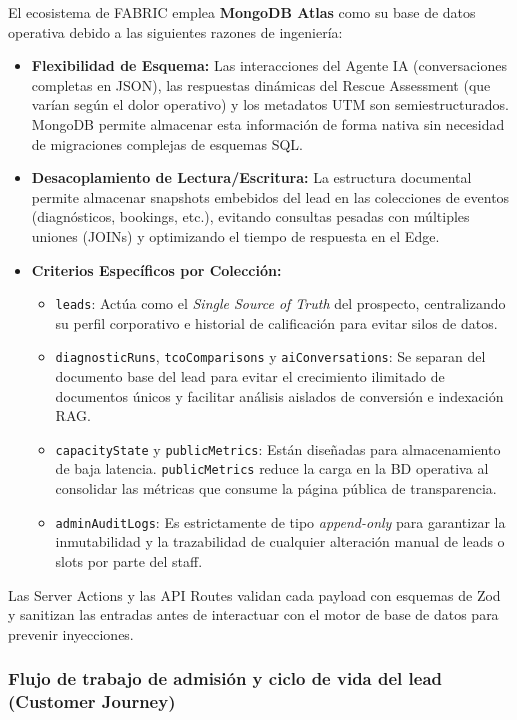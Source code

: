 \documentclass[11pt,letterpaper]{article}
\begin{document}
El ecosistema de FABRIC emplea \textbf{MongoDB Atlas} como su base de datos operativa debido a las siguientes razones de ingeniería:
\begin{itemize}
\item \textbf{Flexibilidad de Esquema:} Las interacciones del Agente IA (conversaciones completas en JSON), las respuestas dinámicas del Rescue Assessment (que varían según el dolor operativo) y los metadatos UTM son semiestructurados. MongoDB permite almacenar esta información de forma nativa sin necesidad de migraciones complejas de esquemas SQL.
\item \textbf{Desacoplamiento de Lectura/Escritura:} La estructura documental permite almacenar snapshots embebidos del lead en las colecciones de eventos (diagnósticos, bookings, etc.), evitando consultas pesadas con múltiples uniones (JOINs) y optimizando el tiempo de respuesta en el Edge.
\item \textbf{Criterios Específicos por Colección:}
  \begin{itemize}
  \item \texttt{leads}: Actúa como el \emph{Single Source of Truth} del prospecto, centralizando su perfil corporativo e historial de calificación para evitar silos de datos.
  \item \texttt{diagnosticRuns}, \texttt{tcoComparisons} y \texttt{aiConversations}: Se separan del documento base del lead para evitar el crecimiento ilimitado de documentos únicos y facilitar análisis aislados de conversión e indexación RAG.
  \item \texttt{capacityState} y \texttt{publicMetrics}: Están diseñadas para almacenamiento de baja latencia. \texttt{publicMetrics} reduce la carga en la BD operativa al consolidar las métricas que consume la página pública de transparencia.
  \item \texttt{adminAuditLogs}: Es estrictamente de tipo \emph{append-only} para garantizar la inmutabilidad y la trazabilidad de cualquier alteración manual de leads o slots por parte del staff.
  \end{itemize}
\end{itemize}

Las Server Actions y las API Routes validan cada payload con esquemas de Zod y sanitizan las entradas antes de interactuar con el motor de base de datos para prevenir inyecciones.

\subsubsection{Flujo de trabajo de admisión y ciclo de vida del lead (Customer Journey)}
\end{document}
